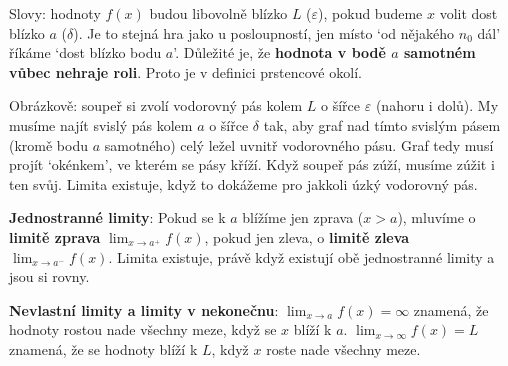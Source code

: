 Slovy: hodnoty $f(x)$ budou libovolně blízko $L$ ($\varepsilon$), pokud budeme $x$ volit dost blízko $a$ ($\delta$). Je to stejná hra jako u posloupností, jen místo `od nějakého $n_0$ dál' říkáme `dost blízko bodu $a$'. Důležité je, že \textbf{hodnota v bodě $a$ samotném vůbec nehraje roli}. Proto je v definici prstencové okolí.

Obrázkově: soupeř si zvolí vodorovný pás kolem $L$ o šířce $\varepsilon$ (nahoru i dolů). My musíme najít svislý pás kolem $a$ o šířce $\delta$ tak, aby graf nad tímto svislým pásem (kromě bodu $a$ samotného) celý ležel uvnitř vodorovného pásu. Graf tedy musí projít `okénkem', ve kterém se pásy kříží. Když soupeř pás zúží, musíme zúžit i ten svůj. Limita existuje, když to dokážeme pro jakkoli úzký vodorovný pás.

\begin{center}
\end{center}

\begin{definitionbox}
  \textbf{Jednostranné limity}: Pokud se k $a$ blížíme jen zprava ($x > a$), mluvíme o \textbf{limitě zprava} $\lim_{x\to a^+} f(x)$, pokud jen zleva, o \textbf{limitě zleva} $\lim_{x\to a^-} f(x)$. Limita existuje, právě když existují obě jednostranné limity a jsou si rovny.

  \vspace{0.2cm}

  \textbf{Nevlastní limity a limity v nekonečnu}: $\lim_{x\to a} f(x) = \infty$ znamená, že hodnoty rostou nade všechny meze, když se $x$ blíží k $a$. $\lim_{x\to\infty} f(x) = L$ znamená, že se hodnoty blíží k $L$, když $x$ roste nade všechny meze.
\end{definitionbox}

